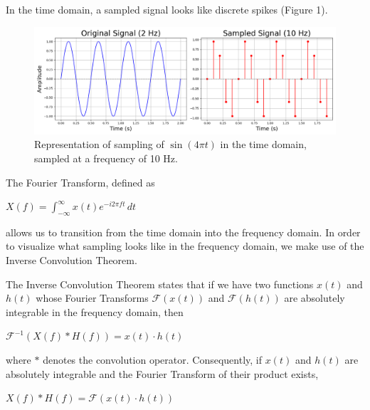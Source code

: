 \documentclass{article}
\begin{document}
In the time domain, a sampled signal looks like discrete spikes (Figure 1). 
\begin{figure}[H]
    \centering
    \includegraphics[width=0.82\linewidth]{images/firstplot_biggertitles.png} %
    \caption{Representation of sampling of $\sin(4\pi t)$ in the time domain, sampled at a frequency of 10 Hz.}
    \label{fig:enter-label}
\end{figure}
The Fourier Transform, defined as
\begin{center}
    \begin{math}
       X(f) = \displaystyle \int_{-\infty}^{\infty} x(t)e^{-i2\pi ft}\, dt
    \end{math}
\end{center}
allows us to transition from the time domain into the frequency domain. In order to visualize what sampling looks like in the frequency domain, we make use of the Inverse Convolution Theorem.

The Inverse Convolution Theorem states that if we have two functions $x(t)$ and $h(t)$ whose Fourier Transforms $\mathcal{F}(x(t))$ and $\mathcal{F}(h(t))$ are absolutely integrable in the frequency domain,
then 
\begin{center}
    \begin{math}
        \mathcal{F}^{-1} \left(X(f) * H(f) \right) = x(t) \cdot h(t)
    \end{math}  
\end{center}
where $*$ denotes the convolution operator. 
Consequently, if $x(t)$ and $h(t)$ are absolutely integrable and the Fourier Transform of their product exists,
\begin{center}
    \begin{math}
        X(f) * H(f) = \mathcal{F}\left(x(t) \cdot h(t)\right)
    \end{math}  
\end{center}
\end{document}
